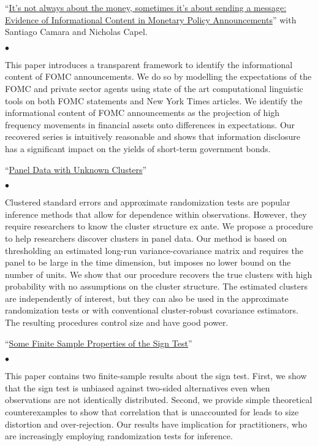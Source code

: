 \documentclass[margin,line]{res}
\newenvironment{list1}{
  \begin{list}{\ding{113}}{%
      \setlength{\itemsep}{.025in}
      \setlength{\parsep}{0in} \setlength{\parskip}{0in}
      \setlength{\topsep}{0in} \setlength{\partopsep}{0in}
      \setlength{\leftmargin}{0.17in}}}{\end{list}}
\newenvironment{list2}{
  \begin{list}{$\bullet$}{%
      \setlength{\itemsep}{0in}
      \setlength{\parsep}{0in} \setlength{\parskip}{0in}
      \setlength{\topsep}{0in} \setlength{\partopsep}{0in}
      \setlength{\leftmargin}{0.2in}}}{\end{list}}
\begin{document}
\begin{resume}
\begin{list1}
\item[] ``\href{https://arxiv.org/pdf/2111.06365}{It's not always about the money, sometimes it's about sending a message: Evidence of Informational Content in Monetary Policy Announcements}'' with Santiago Camara and Nicholas Capel.
	\begin{list2}
		\item[] This paper introduces a transparent framework to identify the informational content of FOMC announcements. We do so by modelling the expectations of the FOMC and private sector agents using state of the art computational linguistic tools on both FOMC statements and New York Times articles. We identify the informational content of FOMC announcements as the projection of high frequency movements in financial assets onto differences in expectations. Our recovered series is intuitively reasonable and shows that information disclosure has a significant impact on the yields of short-term government bonds. \\
	\end{list2}	
\item[] ``\href{https://arxiv.org/pdf/2106.05503.pdf}{Panel Data with Unknown Clusters}''
	\begin{list2}
		\item[] Clustered standard errors and approximate randomization tests are popular inference methods that allow for dependence within observations. However, they require researchers to know the cluster structure ex ante. We propose a procedure to help researchers discover clusters in panel data. Our method is based on thresholding an estimated long-run variance-covariance matrix and requires the panel to be large in the time dimension, but imposes no lower bound on the number of units. We show that our procedure recovers the true clusters with high probability with no assumptions on the cluster structure. The estimated clusters are independently of interest, but they can also be used in the approximate randomization tests or with conventional cluster-robust covariance estimators. The resulting procedures control size and have good power. \\
	\end{list2}
\item[] ``\href{https://arxiv.org/pdf/2103.01412.pdf}{Some Finite Sample Properties of the Sign Test}''
	\begin{list2}
		\item[] This paper contains two finite-sample results about the sign test. First, we show that the sign test is unbiased against two-sided alternatives even when observations are not identically distributed. Second, we provide simple theoretical counterexamples to show that correlation that is unaccounted for leads to size distortion and over-rejection. Our results have implication for practitioners, who are increasingly employing randomization tests for inference.\\
	\end{list2}
\end{list1}



\end{resume}
\end{document}
